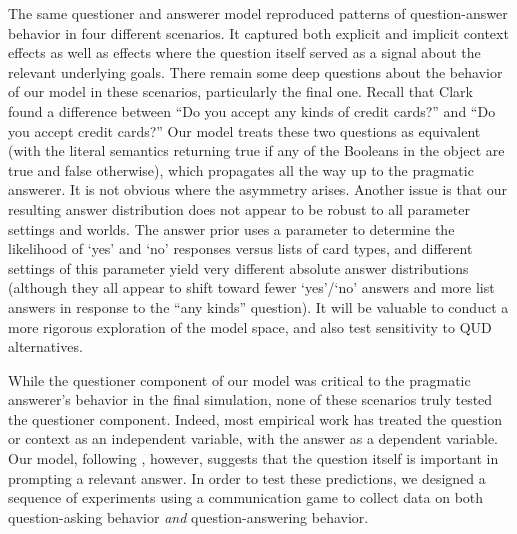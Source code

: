 \documentclass[12pt, floatsintext, jou]{apa6}
\begin{document}
The same questioner and answerer model reproduced patterns of question-answer behavior in four different scenarios. It captured both explicit and implicit context effects as well as effects where the question itself served as a signal about the relevant underlying goals. 
There remain some deep questions about the behavior of our model in these scenarios, particularly the final one. Recall that Clark found a difference between ``Do you accept any kinds of credit cards?'' and ``Do you accept credit cards?'' Our model treats these two questions as equivalent (with the literal semantics returning true if any of the Booleans in the object are true and false otherwise), which propagates all the way up to the pragmatic answerer. It is not obvious where the asymmetry arises.  Another issue is that our resulting answer distribution does not appear to be robust to all parameter settings and worlds. The answer prior uses a parameter to determine the likelihood of `yes' and `no' responses versus lists of card types, and different settings of this parameter yield very different absolute answer distributions (although they all appear to shift toward fewer `yes'/`no' answers and more list answers in response to the ``any kinds'' question). It will be valuable to conduct a more rigorous exploration of the model space, and also test sensitivity to QUD alternatives. 

While the questioner component of our model was critical to the pragmatic answerer's behavior in the final simulation, none of these scenarios truly tested the questioner component.  Indeed, most empirical work has treated the question or context as an independent variable, with the answer as a dependent variable. Our model, following , however, suggests that the question itself is important in prompting a relevant answer. In order to test these predictions, we designed a sequence of experiments using a communication game to collect data on both question-asking behavior \emph{and} question-answering behavior.
\end{document}
